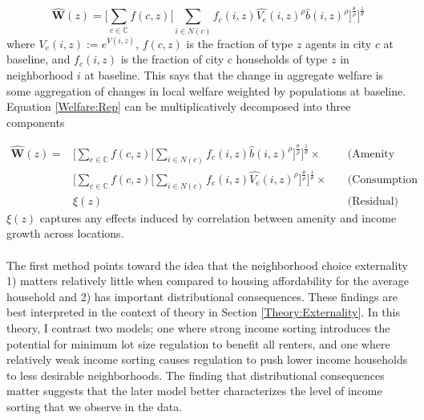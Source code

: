 \documentclass[11pt]{article}
\begin{document}
\begin{equation}\label{Welfare:Rep}
\hat{\boldsymbol{W}}(z) = \bigg[ \sum_{c \in \mathbb{C}} f(c, z) \big[\sum_{i \in N(c)}f_{c}(i, z)\hat{V_{e}}(i, z)^{\rho}\hat{b}(i, z)^{\rho}\big]^{\frac{\theta}{\rho}} \bigg]^{\frac{1}{\theta}}
\end{equation}
where $V_{e}(i, z) := e^{V(i, z)}$, $f(c, z)$ is the fraction of type $z$ agents in city $c$ at baseline, and $f_{c}(i, z)$ is the fraction of city $c$ households of type $z$ in neighborhood $i$ at baseline. This says that the change in aggregate welfare is some aggregation of changes in local welfare weighted by populations at baseline. Equation \eqref{Welfare:Rep} can be multiplicatively decomposed into three components


\begin{eqnarray*}\label{Welfare:Decomp}
	\hat{\boldsymbol{W}}(z) = & 	\bigg[ \sum_{c \in \mathbb{C}} f(c, z) \big[\sum_{i \in N(c)}f_{c}(i, z)\hat{b}(i, z)^{\rho}\big]^{\frac{\theta}{\rho}} \bigg]^{\frac{1}{\theta}} \times & \quad \text{(Amenity component)} \\
	& \bigg[ \sum_{c \in \mathbb{C}} f(c, z) \big[\sum_{i \in N(c)}f_{c}(i, z)\hat{V_{e}}(i, z)^{\rho}\big]^{\frac{\theta}{\rho}} \bigg]^{\frac{1}{\theta}} \times & \quad \text{(Consumption component)} \\
	& \xi(z) & \quad \text{(Residual)}
\end{eqnarray*}
$\xi(z)$ captures any effects induced by correlation between amenity and income growth across locations. 

\paragraph*{}
The first method points toward the idea that the neighborhood choice externality 1) matters relatively little when compared to housing affordability for the average household and 2) has important distributional consequences. These findings are best interpreted in the context of theory in Section \ref{Theory:Externality}. In this theory, I contrast two models; one where strong income sorting introduces the potential for minimum lot size regulation to benefit all renters, and one where relatively weak income sorting causes regulation to push lower income households to less desirable neighborhoods. The finding that distributional consequences matter suggests that the later model better characterizes the level of income sorting that we observe in the data. 
\end{document}
